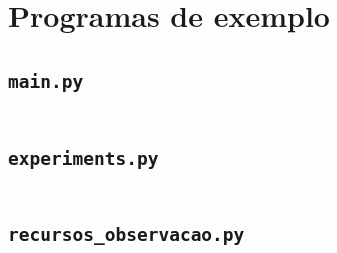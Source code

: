 \section{Programas de exemplo}

\subsection*{\texttt{main.py}}
\inputminted{python}{../main.py}

\subsection*{\texttt{experiments.py}}
\inputminted{python}{../experiments.py}

\subsection*{\texttt{recursos\_observacao.py}}
\inputminted{python}{../recursos_observacao.py}

